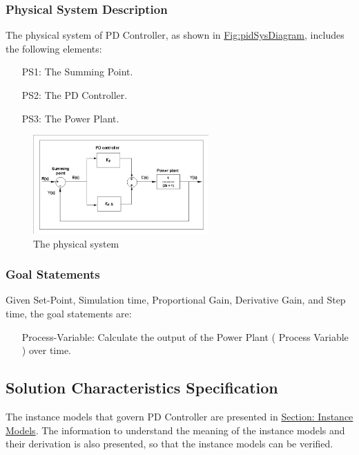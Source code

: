 \documentclass[12pt]{article}
\begin{document}
\subsubsection{Physical System Description}
\label{Sec:PhysSyst}
The physical system of PD Controller, as shown in \hyperref[Figure:pidSysDiagram]{Fig:pidSysDiagram}, includes the following elements:

\begin{itemize}
\item[PS1:]{The Summing Point.}
\item[PS2:]{The PD Controller.}
\item[PS3:]{The Power Plant.}
\end{itemize}
\begin{figure}
\begin{center}
\includegraphics[width=0.6\textwidth]{../../../datafiles/PIDController/Fig_PDController.png}
\caption{The physical system}
\label{Figure:pidSysDiagram}
\end{center}
\end{figure}
\subsubsection{Goal Statements}
\label{Sec:GoalStmt}
Given Set-Point, Simulation time, Proportional Gain, Derivative Gain, and Step time, the goal statements are:

\begin{itemize}
\item[Process-Variable:\phantomsection\label{processVariable}]{Calculate the output of the Power Plant ( Process Variable ) over time.}
\end{itemize}
\subsection{Solution Characteristics Specification}
\label{Sec:SolCharSpec}
The instance models that govern PD Controller are presented in \hyperref[Sec:IMs]{Section: Instance Models}. The information to understand the meaning of the instance models and their derivation is also presented, so that the instance models can be verified.
\end{document}
